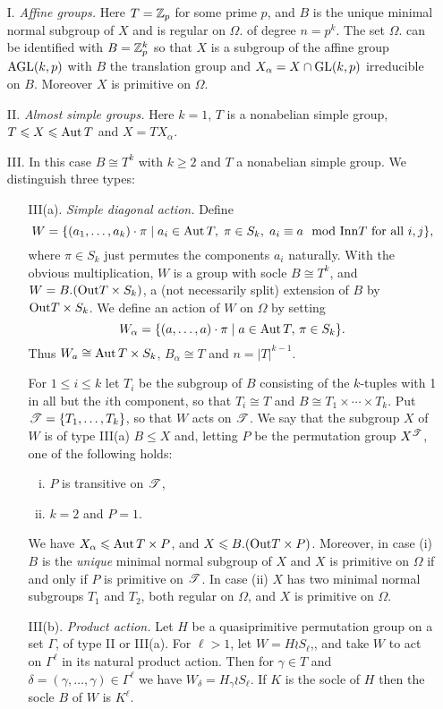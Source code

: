 \begin{enumerate}
\item[I.] 
\emph{Affine groups.} Here $T= \mathbb{Z}_p$ for some prime $p$, and $B$ is the unique minimal
normal subgroup of $X$ and is regular on $\Omega$. of degree $n = p^k$. The set $\Omega$. can be
identified with $B = \mathbb{Z}_p^k$ so that $X$ is a subgroup of the affine group $\mathrm{AGL}(k,p)$ with $B$
the translation group and $X_\alpha = X \cap \mathrm{GL}(k,p)$ irreducible on $B$. Moreover $X$ is
primitive on $\Omega$.
\item[II.] \emph{Almost simple groups.} Here $k = 1$, $T$ is a nonabelian simple group,
$T \leqslant X \leqslant \operatorname{Aut} T$ and $X = T X_\alpha$.
\item[III.] In this case $B \cong T^k$ with $k\geq 2$ and $T$ a nonabelian simple group. We
distinguish three types:
\begin{enumerate}
\item[III(a).] \emph{Simple diagonal action.} Define
\[
W = \{(a_1,\dots, a_k) \cdot \pi \mid a_i\in  \operatorname{Aut} T,\; \pi \in S_k, \;
a_i \equiv a \mod {\mathrm{Inn}} T \text{ for all } i, j\},
\]
where $\pi \in S_k$ just permutes the components $a_i$ naturally. 
With the obvious multiplication, $W$ is a group with socle $B\cong T^k$, 
and $W = B . (\mathrm{Out} T\times S_k)$, a (not
necessarily split) extension of $B$ by $\mathrm{Out} T \times S_k$. 
We define an action of $W$ on $\Omega$ by setting
\[
W_\alpha = \{(a,\dots,a)\cdot \pi \mid a\in \operatorname{Aut} T, \, \pi \in S_k\}.
\]
Thus $W_a \cong \operatorname{Aut} T \times S_k$, $B_\alpha \cong T$ and $n = |T|^{k-1}$.

For $1 \leq  i \leq k$ let $T_i$ be the subgroup of $B$ consisting of the
$k$-tuples with 1 in all but the $i$th component, so that 
$T_i \cong T$ and $B \cong T_1 \times \cdots \times T_k$. Put $\mathscr{T} = \{T_1,
\dots, T_k\}$, so that $W$ acts on $\mathscr{T}$. 
We say that the subgroup $X$ of $W$ is of type III(a) $B\leq X$ and,
letting $P$ be the permutation group $X^{\mathscr{T}}$, one of the following holds:
\begin{enumerate}[(i)]
\item $P$ is transitive on $\mathscr{T}$,
\item $k = 2$ and $P= 1$.
\end{enumerate}
We have $X_\alpha\leqslant  \operatorname{Aut} T \times P$, and $X\leqslant B. (\mathrm{Out} T\times P)$. 
Moreover, in case (i) $B$ is the \emph{unique} minimal normal subgroup of $X$ and $X$ is
primitive on $\Omega$ if and only if $P$ is primitive on $\mathscr{T}$. 
In case (ii) $X$ has two minimal normal subgroups $T_1$ and $T_2$, both
regular on $\Omega$, and $X$ is primitive on $\Omega$.
\item[III(b).] \emph{Product action.} Let $H$ be a quasiprimitive permutation group on a set $\Gamma$,
  of type II or III(a). For $\ell > 1$, let $W = H \wr S_\ell$,, and take $W$ to
  act on $\Gamma^\ell$ in its natural product action. Then for
  $\gamma\in T$ and $\delta = (\gamma,\dots,\gamma)\in \Gamma^\ell$ we have
  $W_\delta = H_\gamma \wr S_\ell$.  If $K$ is the socle of $H$ then the socle
  $B$ of $W$ is $K^\ell$.


\end{enumerate}
\end{enumerate}
